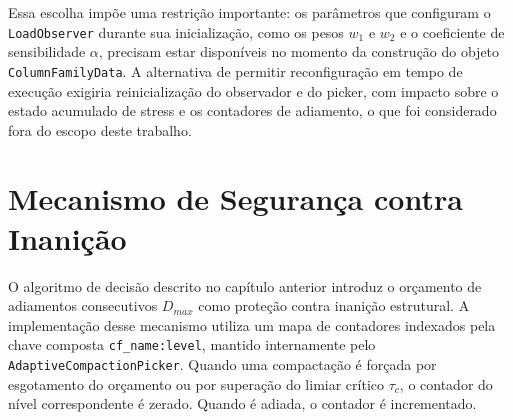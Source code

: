 Essa escolha impõe uma restrição importante: os parâmetros que configuram o
\texttt{LoadObserver} durante sua inicialização, como os pesos $w_1$ e $w_2$
e o coeficiente de sensibilidade $\alpha$, precisam estar disponíveis no momento
da construção do objeto \texttt{ColumnFamilyData}. A alternativa de permitir
reconfiguração em tempo de execução exigiria reinicialização do observador e do
picker, com impacto sobre o estado acumulado de stress e os contadores de
adiamento, o que foi considerado fora do escopo deste trabalho.

\section{Mecanismo de Segurança contra Inanição}

O algoritmo de decisão descrito no capítulo anterior introduz o orçamento de
adiamentos consecutivos $D_{max}$ como proteção contra inanição estrutural. A
implementação desse mecanismo utiliza um mapa de contadores indexados pela chave
composta \texttt{cf\_name:level}, mantido internamente pelo
\texttt{AdaptiveCompactionPicker}. Quando uma compactação é forçada por
esgotamento do orçamento ou por superação do limiar crítico $\tau_c$, o contador
do nível correspondente é zerado. Quando é adiada, o contador é incrementado.
